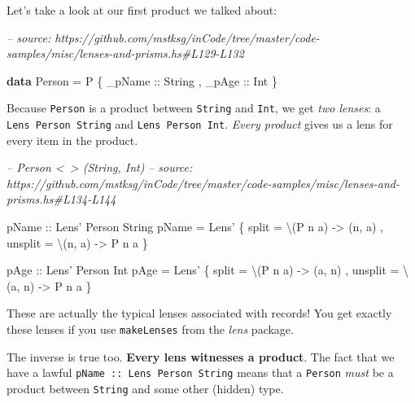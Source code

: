 \documentclass[]{article}
\newenvironment{Shaded}{}{}
\newcommand{\CommentTok}[1]{\textcolor[rgb]{0.38,0.63,0.69}{\textit{#1}}}
\newcommand{\DataTypeTok}[1]{\textcolor[rgb]{0.56,0.13,0.00}{#1}}
\newcommand{\FunctionTok}[1]{\textcolor[rgb]{0.02,0.16,0.49}{#1}}
\newcommand{\KeywordTok}[1]{\textcolor[rgb]{0.00,0.44,0.13}{\textbf{#1}}}
\newcommand{\NormalTok}[1]{#1}
\newcommand{\OtherTok}[1]{\textcolor[rgb]{0.00,0.44,0.13}{#1}}
\begin{document}
Let's take a look at our first product we talked about:

\begin{Shaded}
\begin{Highlighting}[]
\CommentTok{-- source: https://github.com/mstksg/inCode/tree/master/code-samples/misc/lenses-and-prisms.hs#L129-L132}

\KeywordTok{data} \DataTypeTok{Person} \FunctionTok{=} \DataTypeTok{P}
\NormalTok{    \{}\OtherTok{ _pName ::} \DataTypeTok{String}
\NormalTok{    ,}\OtherTok{ _pAge  ::} \DataTypeTok{Int}
\NormalTok{    \}}
\end{Highlighting}
\end{Shaded}

Because \texttt{Person} is a product between \texttt{String} and \texttt{Int},
we get \emph{two lenses}: a \texttt{Lens\textquotesingle{}\ Person\ String} and
\texttt{Lens\textquotesingle{}\ Person\ Int}. \emph{Every product} gives us a
lens for every item in the product.

\begin{Shaded}
\begin{Highlighting}[]
\CommentTok{-- Person <~> (String, Int)}
\CommentTok{-- source: https://github.com/mstksg/inCode/tree/master/code-samples/misc/lenses-and-prisms.hs#L134-L144}

\OtherTok{pName ::} \DataTypeTok{Lens'} \DataTypeTok{Person} \DataTypeTok{String}
\NormalTok{pName }\FunctionTok{=} \DataTypeTok{Lens'}
\NormalTok{    \{ split   }\FunctionTok{=}\NormalTok{ \textbackslash{}(}\DataTypeTok{P}\NormalTok{ n a) }\OtherTok{->}\NormalTok{ (n, a)}
\NormalTok{    , unsplit }\FunctionTok{=}\NormalTok{ \textbackslash{}(n, a)  }\OtherTok{->} \DataTypeTok{P}\NormalTok{ n a}
\NormalTok{    \}}

\OtherTok{pAge ::} \DataTypeTok{Lens'} \DataTypeTok{Person} \DataTypeTok{Int}
\NormalTok{pAge }\FunctionTok{=} \DataTypeTok{Lens'}
\NormalTok{    \{ split   }\FunctionTok{=}\NormalTok{ \textbackslash{}(}\DataTypeTok{P}\NormalTok{ n a) }\OtherTok{->}\NormalTok{ (a, n)}
\NormalTok{    , unsplit }\FunctionTok{=}\NormalTok{ \textbackslash{}(a, n)  }\OtherTok{->} \DataTypeTok{P}\NormalTok{ n a}
\NormalTok{    \}}
\end{Highlighting}
\end{Shaded}

These are actually the typical lenses associated with records! You get exactly
these lenses if you use \texttt{makeLenses} from the \emph{lens} package.

The inverse is true too. \textbf{Every lens witnesses a product}. The fact that
we have a lawful \texttt{pName\ ::\ Lens\textquotesingle{}\ Person\ String}
means that a \texttt{Person} \emph{must} be a product between \texttt{String}
and some other (hidden) type.
\end{document}
